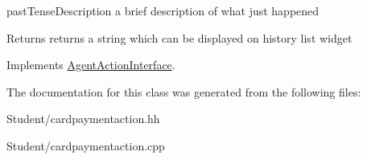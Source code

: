 past\-Tense\-Description a brief description of what just happened 

\begin{DoxyReturn}{Returns}
returns a string which can be displayed on history list widget 
\end{DoxyReturn}


Implements \hyperlink{class_agent_action_interface_a940bd8035e48c8682eb030be937df6e6}{Agent\-Action\-Interface}.



The documentation for this class was generated from the following files\-:\begin{DoxyCompactItemize}
\item 
Student/cardpaymentaction.\-hh\item 
Student/cardpaymentaction.\-cpp\end{DoxyCompactItemize}
